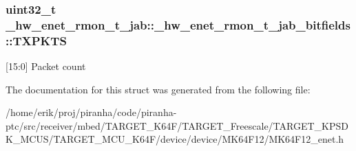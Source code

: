 \subsubsection[{\texorpdfstring{T\+X\+P\+K\+TS}{TXPKTS}}]{\setlength{\rightskip}{0pt plus 5cm}uint32\+\_\+t \+\_\+hw\+\_\+enet\+\_\+rmon\+\_\+t\+\_\+jab\+::\+\_\+hw\+\_\+enet\+\_\+rmon\+\_\+t\+\_\+jab\+\_\+bitfields\+::\+T\+X\+P\+K\+TS}\hypertarget{struct__hw__enet__rmon__t__jab_1_1__hw__enet__rmon__t__jab__bitfields_af0d1765845ed2e1809605a658c47ac6a}{}\label{struct__hw__enet__rmon__t__jab_1_1__hw__enet__rmon__t__jab__bitfields_af0d1765845ed2e1809605a658c47ac6a}
\mbox{[}15\+:0\mbox{]} Packet count 

The documentation for this struct was generated from the following file\+:\begin{DoxyCompactItemize}
\item 
/home/erik/proj/piranha/code/piranha-\/ptc/src/receiver/mbed/\+T\+A\+R\+G\+E\+T\+\_\+\+K64\+F/\+T\+A\+R\+G\+E\+T\+\_\+\+Freescale/\+T\+A\+R\+G\+E\+T\+\_\+\+K\+P\+S\+D\+K\+\_\+\+M\+C\+U\+S/\+T\+A\+R\+G\+E\+T\+\_\+\+M\+C\+U\+\_\+\+K64\+F/device/device/\+M\+K64\+F12/M\+K64\+F12\+\_\+enet.\+h\end{DoxyCompactItemize}
